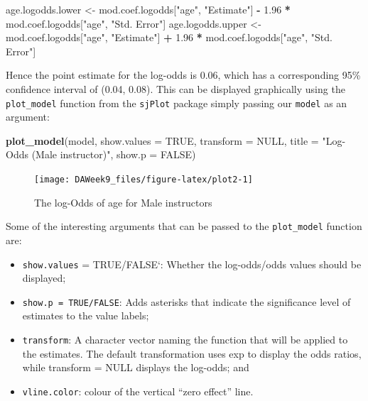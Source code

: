 \documentclass[]{article}
\newenvironment{Shaded}{\begin{snugshade}}{\end{snugshade}}
\newcommand{\KeywordTok}[1]{\textcolor[rgb]{0.13,0.29,0.53}{\textbf{#1}}}
\newcommand{\DataTypeTok}[1]{\textcolor[rgb]{0.13,0.29,0.53}{#1}}
\newcommand{\FloatTok}[1]{\textcolor[rgb]{0.00,0.00,0.81}{#1}}
\newcommand{\StringTok}[1]{\textcolor[rgb]{0.31,0.60,0.02}{#1}}
\newcommand{\OtherTok}[1]{\textcolor[rgb]{0.56,0.35,0.01}{#1}}
\newcommand{\OperatorTok}[1]{\textcolor[rgb]{0.81,0.36,0.00}{\textbf{#1}}}
\newcommand{\NormalTok}[1]{#1}
\providecommand{\tightlist}{%
  \setlength{\itemsep}{0pt}\setlength{\parskip}{0pt}}
\begin{document}
\begin{Shaded}
\begin{Highlighting}[]
\NormalTok{age.logodds.lower <-}\StringTok{ }\NormalTok{mod.coef.logodds[}\StringTok{"age"}\NormalTok{, }\StringTok{"Estimate"}\NormalTok{] }\OperatorTok{-}\StringTok{ }\FloatTok{1.96} \OperatorTok{*}\StringTok{ }\NormalTok{mod.coef.logodds[}\StringTok{"age"}\NormalTok{, }\StringTok{"Std. Error"}\NormalTok{]}
\NormalTok{age.logodds.upper <-}\StringTok{ }\NormalTok{mod.coef.logodds[}\StringTok{"age"}\NormalTok{, }\StringTok{"Estimate"}\NormalTok{] }\OperatorTok{+}\StringTok{ }\FloatTok{1.96} \OperatorTok{*}\StringTok{ }\NormalTok{mod.coef.logodds[}\StringTok{"age"}\NormalTok{, }\StringTok{"Std. Error"}\NormalTok{]}
\end{Highlighting}
\end{Shaded}

Hence the point estimate for the log-odds is 0.06, which has a
corresponding 95\% confidence interval of (0.04, 0.08). This can be
displayed graphically using the \texttt{plot\_model} function from the
\texttt{sjPlot} package simply passing our \texttt{model} as an
argument:

\begin{Shaded}
\begin{Highlighting}[]
\KeywordTok{plot_model}\NormalTok{(model, }\DataTypeTok{show.values =} \OtherTok{TRUE}\NormalTok{, }\DataTypeTok{transform =} \OtherTok{NULL}\NormalTok{, }\DataTypeTok{title =} \StringTok{"Log-Odds (Male instructor)"}\NormalTok{, }\DataTypeTok{show.p =} \OtherTok{FALSE}\NormalTok{)}
\end{Highlighting}
\end{Shaded}

\begin{figure}

{\centering \texttt{[image: DAWeek9\_files/figure-latex/plot2-1]} 

}

\caption{\label{fig.plot2}The log-Odds of age for Male instructors}\label{fig:plot2}
\end{figure}

Some of the interesting arguments that can be passed to the
\texttt{plot\_model} function are:

\begin{itemize}
\tightlist
\item
  \texttt{show.values} = TRUE/FALSE`: Whether the log-odds/odds values
  should be displayed;
\item
  \texttt{show.p\ =\ TRUE/FALSE}: Adds asterisks that indicate the
  significance level of estimates to the value labels;
\item
  \texttt{transform}: A character vector naming the function that will
  be applied to the estimates. The default transformation uses exp to
  display the odds ratios, while transform = NULL displays the log-odds;
  and
\item
  \texttt{vline.color}: colour of the vertical ``zero effect'' line.
\end{itemize}
\end{document}
